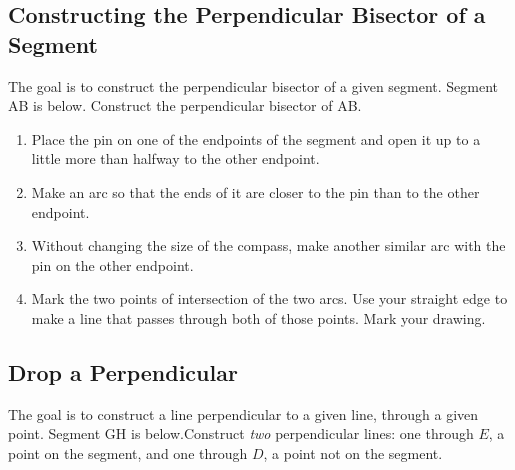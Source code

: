 \subsection{Constructing the Perpendicular Bisector of a Segment}

The goal is to construct the perpendicular bisector of a given segment.  Segment \seg AB is below. \q Construct the perpendicular bisector of \seg AB.

\begin{enumerate}
\item Place the pin on one of the endpoints of the segment and open it up to a little more than halfway to the other endpoint.
\item Make an arc so that the ends of it are closer to the pin than to the other endpoint.
\item Without changing the size of the compass, make another similar arc with the pin on the other endpoint.
\item Mark the two points of intersection of the two arcs.  Use your straight edge to make a line that passes through both of those points.  Mark your drawing.
\end{enumerate}

\vspace{1cm}

\begin{center}
\end{center}

\vspace{0.5cm}

\subsection{Drop a Perpendicular}
The goal is to construct a line perpendicular to a given line, through a given point.  Segment \seg GH is below.\q Construct \emph{two} perpendicular lines: one through $E$, a point on the segment, and one through $D$, a point not on the segment.\\

